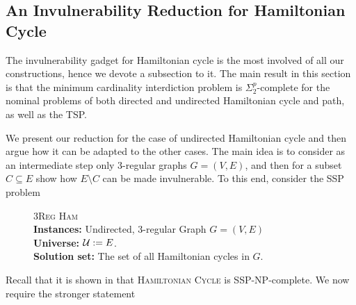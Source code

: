 \subsection{An Invulnerability Reduction for Hamiltonian Cycle}
The invulnerability gadget for Hamiltonian cycle is the most involved of all our constructions, 
hence we devote a subsection to it. 
The main result in this section is that the minimum cardinality interdiction problem is $\Sigma^p_2$-complete for the nominal problems of both directed and undirected Hamiltonian cycle and path, as well as the TSP.

We present our reduction for the case of undirected Hamiltonian cycle and then argue how it can be adapted to the other cases. The main idea is to consider as an intermediate step only 3-regular graphs $G = (V, E)$, and then for a subset $C \subseteq E$ show how $E \setminus C$ can be made invulnerable. To this end, consider the SSP problem

\begin{description}
    \item[]\textsc{3Reg Ham}\hfill\\
    \textbf{Instances:} Undirected, 3-regular Graph $G = (V, E)$\\
    \textbf{Universe:} $\mathcal{U} := E$.\\
    \textbf{Solution set:} The set of all Hamiltonian cycles in $G$.
\end{description}

Recall that it is shown in \cite{gruene2024completeness} that \textsc{Hamiltonian Cycle} is SSP-NP-complete. We now require the stronger statement

